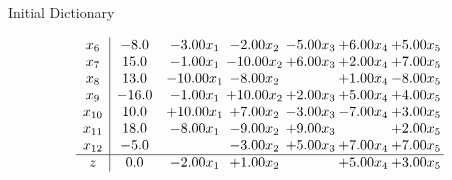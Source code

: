 \documentclass[8pt]{article}
\begin{document}
Initial Dictionary 

\[\begin{array}{c| c c@{\hskip 2pt} c@{\hskip 2pt} c@{\hskip 2pt} c@{\hskip 2pt} c@{\hskip 2pt} }
 x_{6}   &  -8.0 & -3.00 x_{1} & -2.00 x_{2} & -5.00 x_{3} & +  6.00 x_{4} & +  5.00 x_{5}\\
 x_{7}   &  15.0 & -1.00 x_{1} & -10.00 x_{2} & +  6.00 x_{3} & +  2.00 x_{4} & +  7.00 x_{5}\\
 x_{8}   &  13.0 & -10.00 x_{1} & -8.00 x_{2} &   & +  1.00 x_{4} & -8.00 x_{5}\\
 x_{9}   &  -16.0 & -1.00 x_{1} & + 10.00 x_{2} & +  2.00 x_{3} & +  5.00 x_{4} & +  4.00 x_{5}\\
 x_{10}   &  10.0 & + 10.00 x_{1} & +  7.00 x_{2} & -3.00 x_{3} & -7.00 x_{4} & +  3.00 x_{5}\\
 x_{11}   &  18.0 & -8.00 x_{1} & -9.00 x_{2} & +  9.00 x_{3} &   & +  2.00 x_{5}\\
 x_{12}   &  -5.0  &   & -3.00 x_{2} & +  5.00 x_{3} & +  7.00 x_{4} & +  7.00 x_{5}\\
\hline
z    &  0.0 & -2.00 x_{1} & +  1.00 x_{2} &   & +  5.00 x_{4} & +  3.00 x_{5}\\
\end{array}\]
\end{document}
